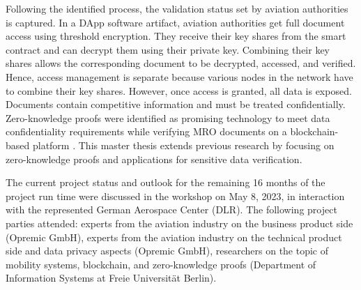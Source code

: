 Following the identified process, the validation status set by aviation authorities is captured. In a DApp software artifact, aviation authorities get full document access using threshold encryption. They receive their key shares from the smart contract and can decrypt them using their private key. Combining their key shares allows the corresponding document to be decrypted, accessed, and verified. Hence, access management is separate because various nodes in the network have to combine their key shares. However, once access is granted, all data is exposed. Documents contain competitive information and must be treated confidentially. Zero-knowledge proofs were identified as promising technology to meet data confidentiality requirements while verifying MRO documents on a blockchain-based platform \citep{ZedelJ}. This master thesis extends previous research by focusing on zero-knowledge proofs and applications for sensitive data verification.

The current project status and outlook for the remaining 16 months of the project run time were discussed in the workshop on May 8, 2023, in interaction with the represented German Aerospace Center (DLR). The following project parties attended: experts from the aviation industry on the business product side (Opremic GmbH), experts from the aviation industry on the technical product side and data privacy aspects (Opremic GmbH), researchers on the topic of mobility systems, blockchain, and zero-knowledge proofs (Department of Information Systems at Freie Universit{\"a}t Berlin). 

